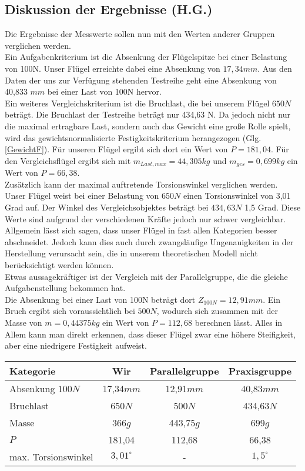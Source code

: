 \subsection{Diskussion der Ergebnisse (H.G.)}
Die Ergebnisse der Messwerte sollen nun mit den Werten anderer Gruppen verglichen werden.\\
\noindent
Ein Aufgabenkriterium ist die Absenkung der Flügelspitze bei einer Belastung von 100N. Unser Flügel erreichte dabei eine Absenkung von $17,34mm$. Aus den Daten der uns zur Verfügung stehenden Testreihe geht eine Absenkung von 40,833 $mm$ bei einer Last von 100N hervor.\\
\noindent
Ein weiteres Vergleichskriterium ist die Bruchlast, die bei unserem Flügel $ 650N $ beträgt. Die Bruchlast der Testreihe beträgt nur 434,63 N. Da jedoch nicht nur die maximal ertragbare Last, sondern auch das Gewicht eine große Rolle spielt, wird das gewichtsnormalisierte Festigkeitskriterium herangezogen (Glg. \ref{GewichtF}). Für unseren Flügel ergibt sich dort ein Wert von $P=181,04$. Für den Vergleichsflügel ergibt sich mit $m_{Last,max}=44,305kg$ und $m_{ges}=0,699kg$ ein Wert von $P=66,38$.\\
\noindent
Zusätzlich kann der maximal auftretende Torsionswinkel verglichen werden. Unser Flügel weist bei einer Belastung von $ 650N $ einen Torsionswinkel von 3,01 Grad auf. Der Winkel des Vergleichsobjektes beträgt bei $434,63 N$  1,5 Grad. Diese Werte sind aufgrund der verschiedenen Kräfte jedoch nur schwer vergleichbar.\\
Allgemein lässt sich sagen, dass unser Flügel in fast allen Kategorien besser abschneidet. Jedoch kann dies auch durch zwangsläufige Ungenauigkeiten in der Herstellung verursacht sein, die in unserem theoretischen Modell nicht berücksichtigt werden können.\\
\noindent
Etwas aussagekräftiger ist der Vergleich mit der Parallelgruppe, die die gleiche Aufgabenstellung bekommen hat.\\
\noindent
Die Absenkung bei einer Last von 100N beträgt dort $Z_{100N}=12,91mm$. Ein Bruch ergibt sich voraussichtlich bei $500N$, wodurch sich zusammen mit der Masse von $m=0,44375kg$ ein Wert von $P=112,68$ berechnen lässt. Alles in Allem kann man direkt erkennen, dass dieser Flügel zwar eine höhere Steifigkeit, aber eine niedrigere Festigkeit aufweist.

\begin{center}
\begin{tabular}[h]{l|c|c|c}
Kategorie&Wir&Parallelgruppe&Praxisgruppe\\
\hline
Absenkung $100N$&17,34$mm$&12,91$mm$&40,83$mm$\\
Bruchlast&650$N$&500$N$&434,63$N$\\
Masse&366$g$&443,75$g$&699$g$\\
$P$&181,04&112,68&66,38\\
max. Torsionswinkel&$3,01^{\circ}$& - &$1,5^{\circ}$
\end{tabular}
\end{center}


